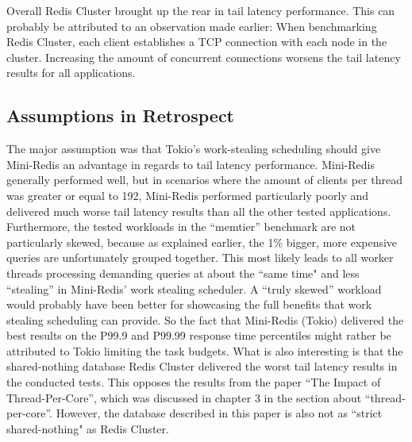 Overall Redis Cluster brought up the rear in tail latency performance. This can probably be attributed to an observation made earlier: When benchmarking Redis Cluster, each client establishes a TCP connection with each node in the cluster. Increasing the amount of concurrent connections worsens the tail latency results for all applications.

\subsection{Assumptions in Retrospect}
The major assumption was that Tokio’s work-stealing scheduling should give Mini-Redis an advantage in regards to tail latency performance. Mini-Redis generally performed well, but in scenarios where the amount of clients per thread was greater or equal to 192, Mini-Redis performed particularly poorly and delivered much worse tail latency results than all the other tested applications. \newline
Furthermore, the tested workloads in the “memtier” benchmark are not particularly skewed, because as explained earlier, the 1\% bigger, more expensive queries are unfortunately grouped together. This most likely leads to all worker threads processing demanding queries at about the “same time" and less “stealing” in Mini-Redis’ work stealing scheduler. A “truly skewed” workload would probably have been better for showcasing the full benefits that work stealing scheduling can provide. So the fact that Mini-Redis (Tokio) delivered the best results on the P99.9 and P99.99 response time percentiles might rather be attributed to Tokio limiting the task budgets.\newline
What is also interesting is that the shared-nothing database Redis Cluster delivered the worst tail latency results in the conducted tests. This opposes the results from the paper “The Impact of Thread-Per-Core”, which was discussed in chapter 3 in the section about “thread-per-core”. However, the database described in this paper is also not as “strict shared-nothing" as Redis Cluster.
